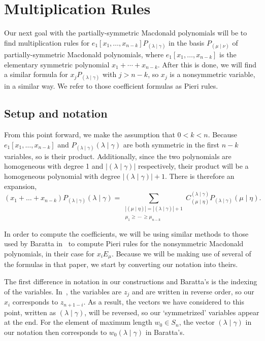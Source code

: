 \documentclass[11pt]{article}
\theoremstyle{definition}
\numberwithin{equation}{section}
\newcommand{\PP}{P_{(\lambda \mid \gamma)}}
\newcommand{\munu}{{(\mu \mid \nu)}}
\newcommand{\nudom}{{( \lambda \mid \gamma )}}
\newcommand{\lambdagamma}{{\nudom}}
\newcommand{\mueta}{{(\mu \mid \eta)}}
\begin{document}
\section{Multiplication Rules}\label{ElementaryMultiplication}

Our next goal with the partially-symmetric Macdonald polynomials will be to find multiplication rules for $e_1[x_1,\dotsc, x_{n-k}] P_{\lambdagamma}$ in the basis $P_{\munu}$ of partially-symmetric Macdonald polynomials, where $e_1[x_1,\dotsc, x_{n-k}]$ is the elementary symmetric polynomial $x_1+ \dotsm + x_{n-k}$. After this is done, we will find a similar formula for $x_j \PP$ with $j>n-k$, so $x_j$ is a nonsymmetric variable, in a similar way. We refer to those coefficient formulas as Pieri rules.


	\subsection{Setup and notation}
From this point forward, we make the assumption that $0<k<n$. Because $e_1[x_1, \dotsc, x_{n-k}]$ and $\PP{\lambdagamma}$ are both symmetric in the first $n-k$ variables, so is their product. Additionally, since the two polynomials are homogeneous with degree 1 and $|\lambdagamma|$ respectively, their product will be a homogeneous polynomial with degree $|\lambdagamma|+1$. There is therefore an expansion,
\begin{equation}\label{finalexpansion} (x_{1} + \dots + x_{n-k}) \PP{\lambdagamma} =  \sum_{\substack{|\mueta| = |\lambdagamma| + 1 \\ \mu_1 \geq \, \dotsm \, \geq \mu_{n-k}}}  C^{\lambdagamma}_{\mueta} \PP{\mueta}.  \end{equation}

In order to compute the coefficients, we will be using similar methods to those used by Baratta in~\cite{MR2525842} to compute Pieri rules for the nonsymmetric Macdonald polynomials, in their case for $x_i E_\mu$. Because we will be making use of several of the formulas in that paper, we start by converting our notation into theirs.

The first difference in notation in our constructions and Baratta's is the indexing of the variables. In~\cite{MR2525842}, the variables are $z_j$ and are written in reverse order, so our $x_i$ corresponds to $z_{n+1-i}$. As a result, the vectors we have considered to this point, written as $\lambdagamma$, will be reversed, so our `symmetrized' variables appear at the end. For the element of maximum length $w_0 \in S_n$, the vector $\lambdagamma$ in our notation then corresponds to $w_0\lambdagamma$ in Baratta's.
\end{document}
